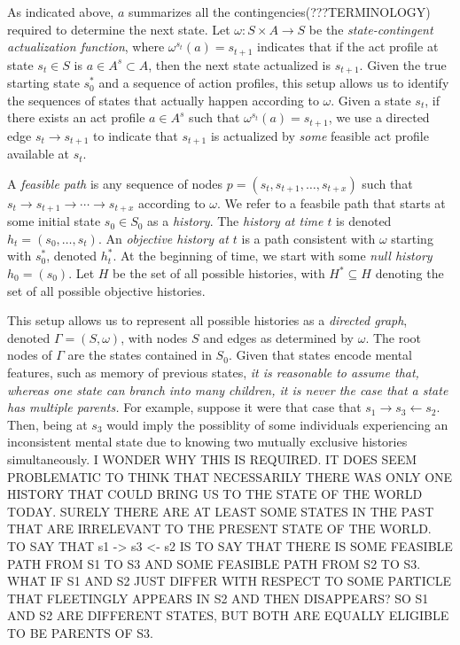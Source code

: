 \documentclass[
11pt,
titlepage,
reqno,
]{article}%
\theoremstyle{definition}
\begin{document}
	As indicated above, $a$ summarizes all the contingencies(???TERMINOLOGY) required to determine the next state. 
	Let $\omega:S\times A\rightarrow S$ be the \textit{state-contingent actualization function}, where $\omega^{s_t}(a)=s_{t+1}$ indicates that if the act profile at state $s_t\in S$ is $a\in A^s\subset A$, then the next state actualized is $s_{t+1}$.
	Given the true starting state $s_0^\ast$ and a sequence of action profiles, this setup allows us to identify the sequences of states that  actually happen according to $\omega$. 
	Given a state $s_t$, if there exists an act profile $a\in A^s$ such that $\omega^{s_t}(a)=s_{t+1}$, we use a directed edge $s_t\rightarrow s_{t+1}$ to indicate that $s_{t+1}$ is actualized by \textit{some} feasible act profile available at $s_t$. 
	
	A \textit{feasible path} is any sequence of nodes $p=(s_t,s_{t+1},\ldots,s_{t+x})$ such that $s_t\rightarrow s_{t+1}\rightarrow \cdots\rightarrow s_{t+x}$ according to $\omega$. 
	We refer to a feasbile path that starts at some initial state $s_0\in S_0$ as a \textit{history}. 
	The  \textit{history at time $t$} is denoted $h_t=(s_0,\ldots,s_t)$.
	An \textit{objective history at $t$} is a path consistent with $\omega$ starting with $s_0^\ast$, denoted $h^\ast_t$. 
	At the beginning of time, we start with some \textit{null history} $h_0=(s_0)$. 
	Let $H$ be the set of all possible histories, with $H^\ast\subseteq H$ denoting the set of all possible objective histories.
	
	This setup allows us to represent all possible histories as a \textit{directed graph}, denoted $\Gamma=(S,\omega)$, with nodes $S$ and edges as determined by  $\omega$.  
	The root nodes of $\Gamma$ are the states contained in $S_0$. 
	Given that states encode mental features, such as memory of previous states,  \textit{it is reasonable to assume that, whereas one state can branch into many  children, it is never the case that a state has multiple parents.} 
	For example, suppose it were that case that $s_1\rightarrow s_3\leftarrow s_2$. 
	Then, being at $s_3$ would imply the possiblity of some individuals experiencing an inconsistent mental state due to knowing two mutually exclusive histories simultaneously. 
	I WONDER WHY THIS IS REQUIRED. IT DOES SEEM PROBLEMATIC TO THINK THAT NECESSARILY THERE WAS ONLY ONE HISTORY THAT COULD BRING US TO THE STATE OF THE WORLD TODAY. SURELY THERE ARE AT LEAST SOME STATES IN THE PAST THAT ARE IRRELEVANT TO THE PRESENT STATE OF THE WORLD. TO SAY THAT s1 -> s3 <- s2 IS TO SAY THAT THERE IS SOME FEASIBLE PATH FROM S1 TO S3 AND SOME FEASIBLE PATH FROM S2 TO S3. WHAT IF S1 AND S2 JUST DIFFER WITH RESPECT TO SOME PARTICLE THAT FLEETINGLY APPEARS IN S2 AND THEN DISAPPEARS? SO S1 AND S2 ARE DIFFERENT STATES, BUT BOTH ARE EQUALLY ELIGIBLE TO BE PARENTS OF S3.
	
\end{document}
